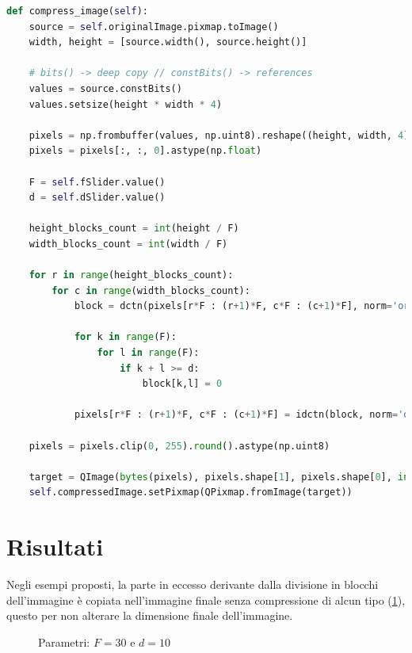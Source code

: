 \documentclass[11pt,italian]{article}
\begin{document}
\newpage
\begin{lstlisting}[language=Python,label=code:algo-compression,caption=Implementazione in Python dell'algoritmo di compressione]
def compress_image(self):
    source = self.originalImage.pixmap.toImage()
    width, height = [source.width(), source.height()]

    # bits() -> deep copy // constBits() -> references
    values = source.constBits()
    values.setsize(height * width * 4)

    pixels = np.frombuffer(values, np.uint8).reshape((height, width, 4)).copy()
    pixels = pixels[:, :, 0].astype(np.float)

    F = self.fSlider.value()
    d = self.dSlider.value()

    height_blocks_count = int(height / F)
    width_blocks_count = int(width / F)

    for r in range(height_blocks_count):
        for c in range(width_blocks_count):
            block = dctn(pixels[r*F : (r+1)*F, c*F : (c+1)*F], norm='ortho')

            for k in range(F):
                for l in range(F):
                    if k + l >= d:
                        block[k,l] = 0

            pixels[r*F : (r+1)*F, c*F : (c+1)*F] = idctn(block, norm='ortho')

    pixels = pixels.clip(0, 255).round().astype(np.uint8)

    target = QImage(bytes(pixels), pixels.shape[1], pixels.shape[0], int(pixels.nbytes/height), QImage.Format_Grayscale8)
    self.compressedImage.setPixmap(QPixmap.fromImage(target))
\end{lstlisting}

\newpage
\section{Risultati}
\label{section:examples}
Negli esempi proposti, la parte in eccesso derivante dalla divisione in blocchi dell'immagine è copiata nell'immagine finale senza compressione di alcun tipo (\cref{fig:c-scale}), questo per non alterare la dimensione finale dell'immagine.
\begin{figure}[H]
    \caption{Parametri: $F=30$ e $d=10$}
    \label{fig:c-scale}
\end{figure}
\end{document}

